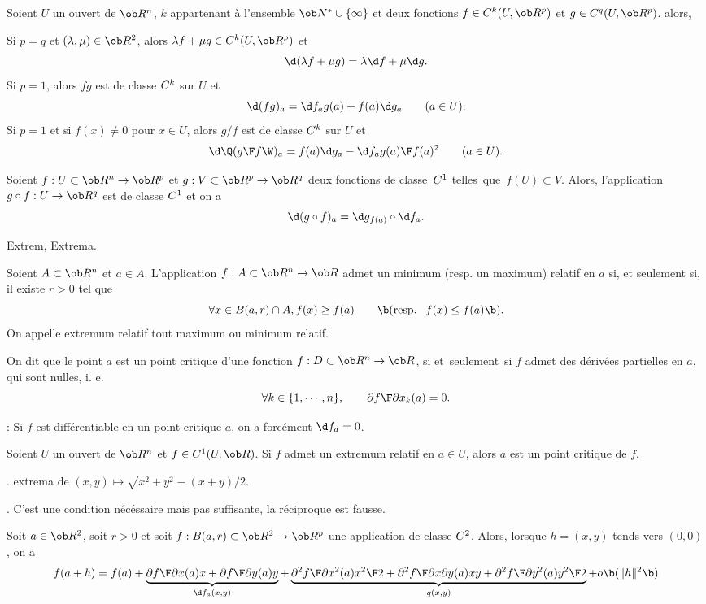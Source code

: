 \Propriete []  Soient $U$ un ouvert de $\ob R^n$, $k$ appartenant \`a l'ensemble $\ob N^*\cup\{\infty\}$ et deux fonctions $f\in\sc C^k(U,\ob R^p)$ et $g\in\sc C^q(U,\ob R^p)$. alors, 
\medskip
 
Si $p=q$ et $(\lambda,\mu)\in\ob R^2$, alors $\lambda f+\mu g\in\sc C^k(U,\ob R^p)$ 
et 
$$
\d(\lambda f+\mu g)=\lambda\d f+\mu\d g.
$$
Si $p=1$, alors $fg$ est de classe $\sc C^k$ sur $U$ et 
$$
\d(fg)_a=\d f_a g(a)+f(a)\d g_a\qquad(a\in U).
$$ 
Si $p=1$ et si $f(x)\neq 0$ pour $x\in U$, alors $g/f$ 
est de classe $\sc C^k$ sur $U$ et 
$$
\d\Q({g\F f}\W)_a={f(a)\d g_a-\d f_ag(a)\F f(a)^2}\qquad(a\in U).
$$ 

\Theoreme []  Soient $f:U\subset\ob R^n\to\ob R^p$ et $g:V\subset\ob R^p\to\ob R^q$ 
deux fonctions de classe~$\sc C^1$ telles~que~$f(U)\subset V$. Alors, l'application $g\circ f:U\to\ob R^q$ 
est de classe $\sc C^1$ et on a 
$$
\d(g\circ f)_a=\d g_{f(a)}\circ \d f_a.
$$ 

\Section Extrem, Extrema. 

\Definition []  Soient $A\subset\ob R^n$ et $a\in A$. 
L'application $f:A\subset\ob R^n\to\ob R$ admet un minimum (resp. un maximum) relatif en $a$ si, et seulement si, 
il existe $r>0$ tel que 
$$
\forall x\in B(a,r)\cap A, f(x)\ge f(a)\qquad\b(\mbox{resp. }\ f(x)\le f(a)\b).
$$
On appelle extremum relatif tout maximum ou minimum relatif. 
\bigskip

\Definition []  On dit que le point $a$ est un point critique d'une fonction $f:D\subset\ob R^n\to \ob R$, si et~seulement~si $f$ admet des d\'eriv\'ees partielles en $a$, 
qui sont nulles, i. e. 
$$
\forall k\in\{1,\cdots, n\}, \qquad {\partial f\F\partial x_k}(a)=0.
$$

\Remarque : Si $f$ est diff\'erentiable en un point critique $a$, on a forc\'ement $\d f_a=0$. 
\bigskip


\Theoreme []  Soient $U$ un ouvert de $\ob R^n$ et $f\in\sc C^1(U,\ob R)$. Si $f$ admet un extremum relatif en $a\in U$, 
alors $a$ est un point critique de $f$.  
\bigskip

\Exemple. extrema de $(x,y)\mapsto \sqrt{x^2+y^2}-(x+y)/2$. 
\bigskip

\Remarque. C'est une condition n\'ec\'essaire mais pas suffisante, la r\'eciproque est fausse. 
\bigskip

\Theoreme [Title=Formule de Taylor Young]
Soit $a\in\ob R^2$, soit $r>0$ et soit $f: B(a,r)\subset\ob R^2\to\ob R^p$ 
une application de classe $\sc C^2$. Alors, lorsque $h=(x,y)$ tends vers $(0,0)$, on a 
$$
f(a+h)=f(a)+\underbrace{{\partial f\F\partial x}(a)x+{\partial f\F\partial y}(a)y}_{\d f_a(x,y)}+
\underbrace{{\partial^2f\F\partial x^2}(a){x^2\F2}+{\partial^2f\F\partial x\partial y}(a)xy
+{\partial^2f\F\partial y^2}(a){y^2\F2}}_{q(x,y)}+o\b(\|h\|^2\b)
$$


